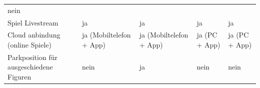 \begin{longtable}[]{@{}lllll@{}}
\begin{minipage}[t]{0.13\columnwidth}
nein\strut
\end{minipage}\tabularnewline
\begin{minipage}[t]{0.18\columnwidth}\raggedright
Spiel Livestream\strut
\end{minipage} & \begin{minipage}[t]{0.18\columnwidth}\raggedright
ja\strut
\end{minipage} & \begin{minipage}[t]{0.22\columnwidth}\raggedright
ja\strut
\end{minipage} & \begin{minipage}[t]{0.15\columnwidth}\raggedright
ja\strut
\end{minipage} & \begin{minipage}[t]{0.13\columnwidth}\raggedright
ja\strut
\end{minipage}\tabularnewline
\begin{minipage}[t]{0.18\columnwidth}\raggedright
Cloud anbindung (online Spiele)\strut
\end{minipage} & \begin{minipage}[t]{0.18\columnwidth}\raggedright
ja (Mobiltelefon + App)\strut
\end{minipage} & \begin{minipage}[t]{0.22\columnwidth}\raggedright
ja (Mobiltelefon + App)\strut
\end{minipage} & \begin{minipage}[t]{0.15\columnwidth}\raggedright
ja (PC + App)\strut
\end{minipage} & \begin{minipage}[t]{0.13\columnwidth}\raggedright
ja (PC + App)\strut
\end{minipage}\tabularnewline
\begin{minipage}[t]{0.18\columnwidth}\raggedright
Parkposition für ausgeschiedene Figuren\strut
\end{minipage} & \begin{minipage}[t]{0.18\columnwidth}\raggedright
nein\strut
\end{minipage} & \begin{minipage}[t]{0.22\columnwidth}\raggedright
ja\strut
\end{minipage} & \begin{minipage}[t]{0.15\columnwidth}\raggedright
nein\strut
\end{minipage} & \begin{minipage}[t]{0.13\columnwidth}\raggedright
nein\strut
\end{minipage}\tabularnewline

\end{longtable}
